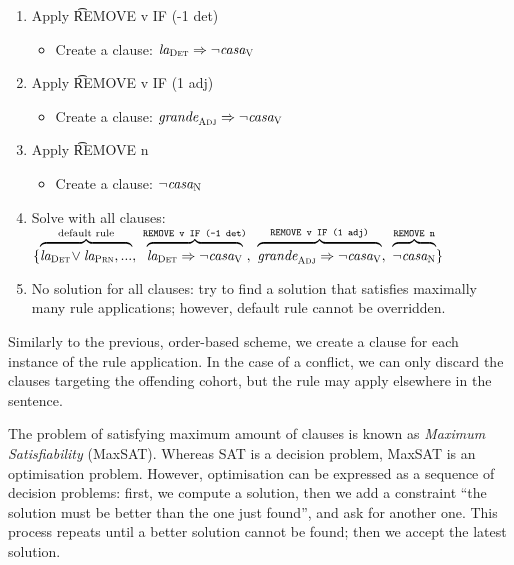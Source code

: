 \begin{enumerate}
\item Apply \t{REMOVE v IF (-1 det)}
 \begin{itemize}
    \item Create a clause: $\text{\em la}_{\text{\sc Det}} \Rightarrow \neg \text{\em casa}_{\text{\sc V}}$
 \end{itemize}
\item Apply \t{REMOVE v IF (1 adj)} 
 \begin{itemize}
    \item Create a clause: $\text{\em grande}_{\text{\sc Adj}} \Rightarrow \neg \text{\em casa}_{\text{\sc V}}$
 \end{itemize}
\item Apply \t{REMOVE n}
 \begin{itemize}
    \item Create a clause: $\neg \text{\em casa}_{\text{\sc N}}$
 \end{itemize}

\item Solve with all clauses:
  $\{ \ob{\laDet \! \vee \laPrn, ...}^{\text{default rule}}, \ 
      \ob{\laDet \Rightarrow \neg \casaV}^{\t{REMOVE v IF (-1 det)}}, \ 
      \ob{\grandeAdj \Rightarrow \neg \casaV}^{\t{REMOVE v IF (1 adj)}}, \ 
      \ob{\neg \casaN}^{\t{REMOVE n}} \}$
\item No solution for all clauses: try to find a solution that satisfies maximally many rule applications; however, default rule cannot be overridden.
\end{enumerate}

Similarly to the previous, order-based scheme, we create a clause for each 
instance of the rule application. In the case of a conflict, we can 
only discard the clauses targeting the offending cohort, but the rule may apply 
elsewhere in the sentence.


The problem of satisfying maximum amount of clauses is known as \emph{Maximum Satisfiability} (MaxSAT).
Whereas SAT is a decision problem, MaxSAT is an optimisation problem.
However, optimisation can be expressed as a sequence of decision problems:
first, we compute a solution, then we add a constraint ``the solution must be better than the one just found'', and ask for another one. 
This process repeats until a better solution cannot be found; then we accept the 
latest solution.

